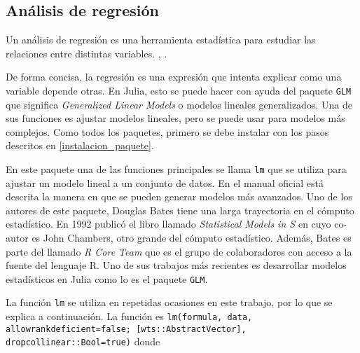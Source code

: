 \subsection{Análisis de regresión} \label{cap_regresiones}

Un análisis de regresión es una herramienta estadística para estudiar las relaciones entre distintas variables. , \cite{regression_other_stories}. 

De forma concisa, la regresión es una expresión que intenta explicar como una variable depende otras. En \textsf{Julia}, esto se puede hacer con ayuda del paquete \texttt{GLM} que significa \textit{Generalized Linear Models} o modelos lineales generalizados. Una de sus funciones es ajustar modelos lineales, pero se puede usar para modelos más complejos. Como todos los paquetes, primero se debe instalar con los pasos descritos en \ref{instalacion_paquete}. 

En este paquete una de las funciones principales se llama \texttt{lm} que se utiliza para ajustar un modelo lineal a un conjunto de datos. En el manual oficial \cite{glm_manual} está descrita la manera en que se pueden generar modelos más avanzados. Uno de los autores de este paquete, Douglas Bates tiene una larga trayectoria en el cómputo estadístico. En 1992 publicó el libro llamado \textit{Statistical Models in S} en cuyo co-autor es John Chambers, otro grande del cómputo estadístico. Además, Bates es parte del llamado \textit{R Core Team} que es el grupo de colaboradores con acceso a la fuente del lenguaje \textsf{R}. Uno de sus trabajos más recientes es desarrollar modelos estadísticos en \textsf{Julia} como lo es el paquete \texttt{GLM}. 

La función \texttt{lm} se utiliza en repetidas ocasiones en este trabajo, por lo que se explica a continuación. La función es \texttt{lm(formula, data, allowrankdeficient=false; [wts::AbstractVector], dropcollinear::Bool=true)} donde 

